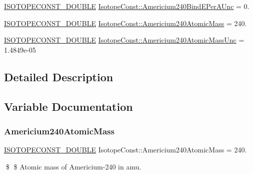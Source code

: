 \begin{DoxyCompactItemize}
\mbox{\hyperlink{group___isotope_const-_macros_ga8f45a7272ce02c0b4c65c44636ed719a}{I\+S\+O\+T\+O\+P\+E\+C\+O\+N\+S\+T\+\_\+\+D\+O\+U\+B\+LE}} \mbox{\hyperlink{group___isotope_const-_americium-_am240_ga33cbd93f05ab942dfbe9096a041f6fc8}{Isotope\+Const\+::\+Americium240\+Bind\+E\+Per\+A\+Unc}} = 0.
\item 
\mbox{\hyperlink{group___isotope_const-_macros_ga8f45a7272ce02c0b4c65c44636ed719a}{I\+S\+O\+T\+O\+P\+E\+C\+O\+N\+S\+T\+\_\+\+D\+O\+U\+B\+LE}} \mbox{\hyperlink{group___isotope_const-_americium-_am240_gaaaeec1ff1aab38d4d86066a55894f724}{Isotope\+Const\+::\+Americium240\+Atomic\+Mass}} = 240.
\item 
\mbox{\hyperlink{group___isotope_const-_macros_ga8f45a7272ce02c0b4c65c44636ed719a}{I\+S\+O\+T\+O\+P\+E\+C\+O\+N\+S\+T\+\_\+\+D\+O\+U\+B\+LE}} \mbox{\hyperlink{group___isotope_const-_americium-_am240_gaa3c9f90f5e266076ad7c200bb846f6cd}{Isotope\+Const\+::\+Americium240\+Atomic\+Mass\+Unc}} = 1.\+4849e-\/05
\end{DoxyCompactItemize}


\subsection{Detailed Description}


\subsection{Variable Documentation}
\mbox{\label{group___isotope_const-_americium-_am240_gaaaeec1ff1aab38d4d86066a55894f724}} 
\subsubsection{\texorpdfstring{Americium240\+Atomic\+Mass}{Americium240AtomicMass}}
{\footnotesize\ttfamily \mbox{\hyperlink{group___isotope_const-_macros_ga8f45a7272ce02c0b4c65c44636ed719a}{I\+S\+O\+T\+O\+P\+E\+C\+O\+N\+S\+T\+\_\+\+D\+O\+U\+B\+LE}} Isotope\+Const\+::\+Americium240\+Atomic\+Mass = 240.}

\$ \$ Atomic mass of Americium-\/240 in amu. \mbox{\label{group___isotope_const-_americium-_am240_gaa3c9f90f5e266076ad7c200bb846f6cd}} 
